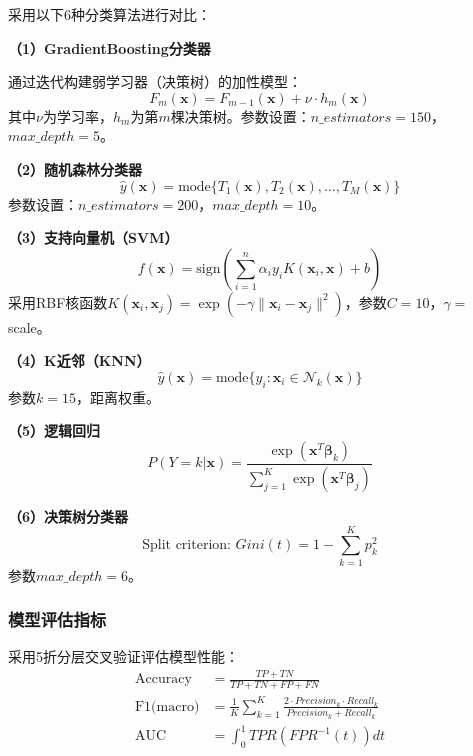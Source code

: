 \documentclass[12pt,a4paper]{ctexart}
\begin{document}
采用以下6种分类算法进行对比：

\textbf{（1）GradientBoosting分类器}

通过迭代构建弱学习器（决策树）的加性模型：
\begin{equation}
    F_m(\mathbf{x}) = F_{m-1}(\mathbf{x}) + \nu \cdot h_m(\mathbf{x})
\end{equation}
其中$\nu$为学习率，$h_m$为第$m$棵决策树。参数设置：$n\_estimators=150$，$max\_depth=5$。

\textbf{（2）随机森林分类器}
\begin{equation}
    \hat{y}(\mathbf{x}) = \text{mode}\{T_1(\mathbf{x}), T_2(\mathbf{x}), \dots, T_M(\mathbf{x})\}
\end{equation}
参数设置：$n\_estimators=200$，$max\_depth=10$。

\textbf{（3）支持向量机（SVM）}
\begin{equation}
    f(\mathbf{x}) = \text{sign}\left(\sum_{i=1}^{n}\alpha_i y_i K(\mathbf{x}_i, \mathbf{x}) + b\right)
\end{equation}
采用RBF核函数$K(\mathbf{x}_i,\mathbf{x}_j)=\exp(-\gamma\|\mathbf{x}_i-\mathbf{x}_j\|^2)$，参数$C=10$，$\gamma=$scale。

\textbf{（4）K近邻（KNN）}
\begin{equation}
    \hat{y}(\mathbf{x}) = \text{mode}\{y_i : \mathbf{x}_i \in \mathcal{N}_k(\mathbf{x})\}
\end{equation}
参数$k=15$，距离权重。

\textbf{（5）逻辑回归}
\begin{equation}
    P(Y=k|\mathbf{x}) = \frac{\exp(\mathbf{x}^T\bm{\beta}_k)}{\sum_{j=1}^{K}\exp(\mathbf{x}^T\bm{\beta}_j)}
\end{equation}

\textbf{（6）决策树分类器}
\begin{equation}
    \text{Split criterion: } Gini(t) = 1 - \sum_{k=1}^{K}p_k^2
\end{equation}
参数$max\_depth=6$。

\subsubsection{模型评估指标}

采用5折分层交叉验证评估模型性能：
\begin{align}
    \text{Accuracy} &= \frac{TP+TN}{TP+TN+FP+FN} \\
    \text{F1(macro)} &= \frac{1}{K}\sum_{k=1}^{K}\frac{2\cdot Precision_k \cdot Recall_k}{Precision_k + Recall_k} \\
    \text{AUC} &= \int_0^1 TPR(FPR^{-1}(t))dt
\end{align}
\end{document}
